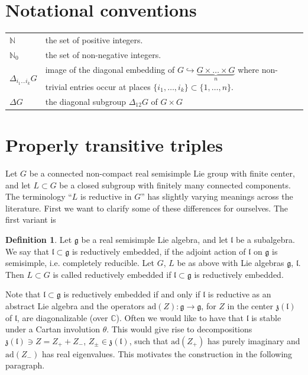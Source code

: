 \documentclass[10]{amsart}
\theoremstyle{remark}
\theoremstyle{definition}
\newtheorem{Def}[thm]{Definition}
\numberwithin{equation}{section}
\newcommand{\C}{\mathbb{C}}           %
\newcommand{\N}{\mathbb{N}}           %
\newcommand{\ad}{\text{ad}}
\newcommand{\fg}{{\mathfrak g}}
\newcommand{\fl}{{\mathfrak l}}
\newcommand{\fz}{{\mathfrak z}}
\begin{document}
{%

\section*{Notational conventions}

\begin{longtable}{p{3cm}p{10cm}}

$\N$ & the set of positive integers.\\[0.3cm]

$\N_0$ & the set of non-negative integers.\\[0.3cm]

$\Delta _{i_1\dots i_k}G$ & image of the diagonal embedding of $G\hookrightarrow \underbrace{G\times\dots\times G}_{n}$ where non-trivial entries occur at places $\{i_1,\dots,i_k\}\subset\{1,\dots,n\}$.\\[0.3cm]

$\Delta G$ & the diagonal subgroup $\Delta_{12} G$ of $G\times G$
\end{longtable}


\section{Properly transitive triples}\label{triples}

Let $G$ be a connected non-compact real semisimple Lie group with finite center, and let $L\subset G$ be a closed subgroup with finitely many connected components. The terminology ``$L$ is reductive in $G$'' has slightly varying meanings across the literature. First we want to clarify some of these differences for ourselves. The first variant is 

\begin{Def}\label{redem}
Let $\fg$ be a real semisimple Lie algebra, and let $\fl$ be a subalgebra. We say that $\fl\subset \fg$ is reductively embedded, if the adjoint action
of $\fl$ on $\fg$ is semisimple, i.e. completely reducible. Let $G$, $L$ be as above with Lie algebras $\fg$, $\fl$. Then $L\subset G$ is called reductively embedded if $\fl\subset \fg$ is reductively embedded.
\end{Def}
Note that $\fl\subset \fg$ is reductively embedded if and only if $\fl$ is reductive as an abstract Lie algebra and the operators $\ad(Z):\fg\rightarrow\fg$, for $Z$ in the center $\fz(\fl)$ of $\fl$, are diagonalizable (over $\C$). Often we would like to have that $\fl$ is stable under a Cartan involution $\theta$. This would give rise to decompositions
$\fz(\fl)\ni Z=Z_++Z_-$, $Z_\pm\in \fz(\fl)$, such that $\ad(Z_+)$ has purely imaginary and $\ad(Z_-)$ has real eigenvalues. This motivates the construction in the following
paragraph.

}
\end{document}
